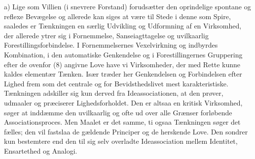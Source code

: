 \documentclass[12pt,a4paper,openany]{book}
\newcommand{\opage}[1]{\marginnote{\footnotesize\textit{[#1]}}}
\begin{document}
\opage{211}a) Lige som Villien (i snevrere Forstand) forudsætter den
oprindelige spontane og reflexe Bevægelse og allerede kan siges at være
til Stede i denne som Spire, saaledes er Tænkningen en særlig Udvikling
og Udformning af en Virksomhed, der allerede ytrer sig i Fornemmelse,
Sanseiagttagelse og uvilkaarlig Forestillingsforbindelse. I
Fornemmelsernes Vexelvirkning og indbyrdes Kombination, i den
automatiske Genkendelse og i Forestillingernes Gruppering efter de
ovenfor (8) angivne Love have vi Virksomheder, der med Rette kunne
kaldes elementær Tænken. Især træder her Genkendelsen og Forbindelsen
efter Lighed frem som det centrale og for Bevidsthedslivet mest
karakteristiske. Tænkningen adskiller sig kun derved fra
Ideassociationen, at den prøver, udmaaler og præciserer
Lighedsforholdet. Den er altsaa en kritisk Virksomhed, søger at inddæmme
den uvilkaarlig og ofte ud over alle Grænser forløbende
Associationsproces. Men Maalet er det samme, ti ogsaa Tænkningen søger
det fælles; den vil fastslaa de gældende Principer og de herskende Love.
Den sondrer kun bestemtere end den til sig selv overladte Ideassociation
mellem Identitet, Ensartethed og Analogi.
\end{document}
